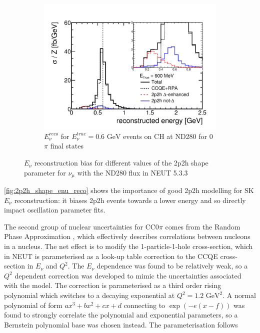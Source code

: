 \begin{figure}[h]
\begin{subfigure}[t]{0.42\textwidth}
	\includegraphics[width=\textwidth, trim={20mm 10mm 25mm 40mm}, clip,page=1]{figures/niwg/delta_notdelta}
	\caption{$E_\nu^{reco}$ for $E_\nu^{true}=0.6\text{ GeV}$ events on CH at ND280 for 0$\pi$ final states}
	\label{fig:2p2h_shape_enu_reco}
\end{subfigure}
	\caption{$E_\nu$ reconstruction bias for different values of the 2p2h shape parameter for $\nu_\mu$ with the ND280 flux in NEUT 5.3.3}
	\label{fig:2p2h_shape_enu}
\end{figure}

\autoref{fig:2p2h_shape_enu_reco} shows the importance of good 2p2h modelling for SK $E_\nu$ reconstruction: it biases 2p2h events towards a lower energy and so directly impact oscillation parameter fits.

The second group of nuclear uncertainties for CC0$\pi$ comes from the Random Phase Approximation \cite{nieves2}, which effectively describes correlations between nucleons in a nucleus. The net effect is to modify the 1-particle-1-hole\cite{nieves1} cross-section, which in NEUT is parameterised as a look-up table correction to the CCQE cross-section in $E_\nu$ and $Q^2$. The $E_\nu$ dependence was found to be relatively weak, so a $Q^2$ dependent correction was developed to mimic the uncertainties associated with the model\cite{nieves1}. The correction is parameterised as a third order rising polynomial which switches to a decaying exponential at $Q^2=1.2\text{ GeV}^2$. A normal polynomial of form $ax^3+bx^2+cx+d$ connecting to $\exp{\left(-e(x-f)\right)}$ was found to strongly correlate the polynomial and exponential parameters, so a Bernstein polynomial base was chosen instead. The parameterisation follows

